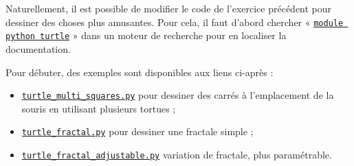 \begin{exercise}[title=Dessin de carré, level=advanced]
Naturellement, il est possible de modifier le code de l'exercice précédent pour dessiner des choses plus amusantes. Pour cela, il faut d'abord chercher « \href{https://docs.python.org/3/library/turtle.html}{\texttt{module python turtle}} » dans un moteur de recherche pour en localiser la documentation.


Pour débuter, des exemples sont disponibles aux liens ci-après :
\begin{itemize}\jazzitem
	\item \href{https://nbhosting.inria.fr/48563/notebooks/w1/media/turtle_multi_squares.py}{\texttt{turtle\_multi\_squares.py}} pour dessiner des carrés à l'emplacement de la souris en utilisant plusieurs tortues ;
	\item \href{https://nbhosting.inria.fr/48563/notebooks/w1/media/turtle_fractal.py}{\texttt{turtle\_fractal.py}} pour dessiner une fractale simple ;
	\item \href{https://nbhosting.inria.fr/48563/notebooks/w1/media/turtle_fractal_reglable.py}{\texttt{turtle\_fractal\_adjustable.py}} variation de fractale, plus paramétrable.
\end{itemize}
\end{exercise}


